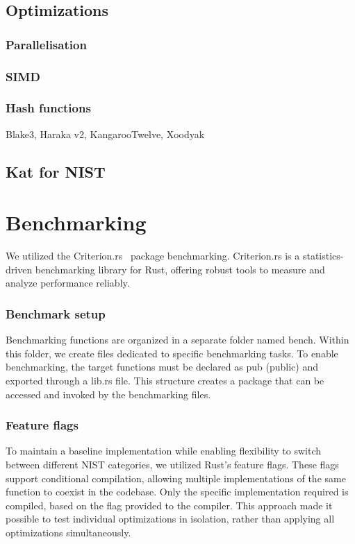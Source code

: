 \documentclass[11pt]{report}
\theoremstyle{definition}
\theoremstyle{plain}
\begin{document}
\section{Optimizations}


\subsection{Parallelisation}\label{sub:rayon} %


\subsection{SIMD}\label{sub:simd} %


\subsection{Hash functions}
Blake3, Haraka v2, KangarooTwelve, Xoodyak

\section{Kat for NIST}\label{sub:kat_for_nist} %

\chapter{Benchmarking}\label{ch:bench}


We utilized the Criterion.rs~\cite{criterion} package benchmarking. Criterion.rs is a statistics-driven benchmarking library for Rust, offering robust tools to measure and analyze performance reliably.

\subsection{Benchmark setup}
Benchmarking functions are organized in a separate folder named bench. Within this folder, we create files dedicated to specific benchmarking tasks. To enable benchmarking, the target functions must be declared as pub (public) and exported through a lib.rs file. This structure creates a package that can be accessed and invoked by the benchmarking files.

\subsection{Feature flags}\label{sub:feature_flags} %
To maintain a baseline implementation while enabling flexibility to switch between different NIST categories, we utilized Rust's feature flags. These flags support conditional compilation, allowing multiple implementations of the same function to coexist in the codebase. Only the specific implementation required is compiled, based on the flag provided to the compiler. This approach made it possible to test individual optimizations in isolation, rather than applying all optimizations simultaneously.
\end{document}
